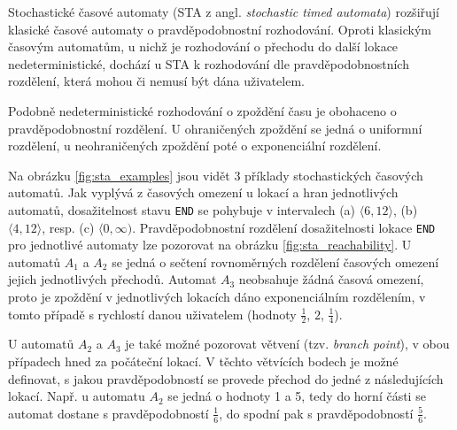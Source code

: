 Stochastické časové automaty (STA z angl. \textit{stochastic timed automata}) rozšiřují klasické časové automaty o pravděpodobnostní rozhodování. Oproti klasickým časovým automatům, u nichž je rozhodování o přechodu do další lokace nedeterministické, dochází u STA k rozhodování dle pravděpodobnostních rozdělení, která mohou či nemusí být dána uživatelem.

Podobně nedeterministické rozhodování o zpoždění času je obohaceno o pravděpodobnostní rozdělení. U ohraničených zpoždění se jedná o uniformní rozdělení, u neohraničených zpoždění poté o exponenciální rozdělení.

Na obrázku \ref{fig:sta_examples} jsou vidět 3 příklady stochastických časových automatů. Jak vyplývá z časových omezení u lokací a hran jednotlivých automatů, dosažitelnost stavu \texttt{END} se pohybuje v intervalech (a) $\langle 6, 12 \rangle$, (b) $\langle 4, 12 \rangle$, resp. (c) $\langle 0, \infty )$. Pravděpodobnostní rozdělení dosažitelnosti lokace \texttt{END} pro jednotlivé automaty lze pozorovat na obrázku \ref{fig:sta_reachability}. U automatů $A_1$ a $A_2$ se jedná o sečtení rovnoměrných rozdělení časových omezení jejich jednotlivých přechodů. Automat $A_3$ neobsahuje žádná časová omezení, proto je zpoždění v jednotlivých lokacích dáno exponenciálním rozdělením, v tomto případě s rychlostí danou uživatelem (hodnoty $\frac{1}{2}$, $2$, $\frac{1}{4}$).

U automatů $A_2$ a $A_3$ je také možné pozorovat větvení (tzv. \textit{branch point}), v obou případech hned za počáteční lokací. V těchto větvících bodech je možné definovat, s jakou pravděpodobností se provede přechod do jedné z následujících lokací. Např. u automatu $A_2$ se jedná o hodnoty 1 a 5, tedy do horní části se automat dostane s pravděpodobností $\frac{1}{6}$, do spodní pak s pravděpodobností $\frac{5}{6}$.


